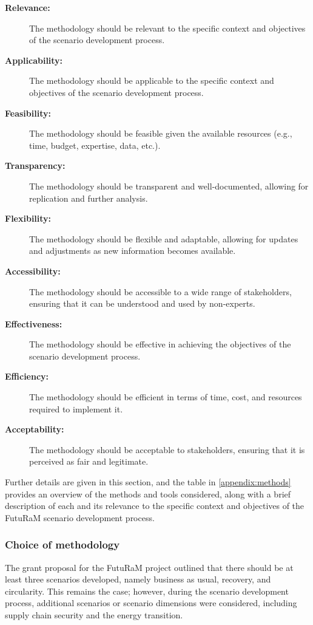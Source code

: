 \begin{description}
  \item[\textbf{Relevance:}]
        The methodology should be relevant to the specific context and objectives of the scenario development process.
  \item[\textbf{Applicability:}]
        The methodology should be applicable to the specific context and objectives of the scenario development process.
  \item[\textbf{Feasibility:}]
        The methodology should be feasible given the available resources (e.g., time, budget, expertise, data, etc.).
  \item[\textbf{Transparency:}]
        The methodology should be transparent and well-documented, allowing for replication and further analysis.
  \item[\textbf{Flexibility:}]
        The methodology should be flexible and adaptable, allowing for updates and adjustments as new information becomes available.
  \item[\textbf{Accessibility:}]
        The methodology should be accessible to a wide range of stakeholders, ensuring that it can be understood and used by non-experts.
  \item[\textbf{Effectiveness:}]
        The methodology should be effective in achieving the objectives of the scenario development process.
  \item[\textbf{Efficiency:}]
        The methodology should be efficient in terms of time, cost, and resources required to implement it.
  \item[\textbf{Acceptability:}]
        The methodology should be acceptable to stakeholders, ensuring that it is perceived as fair and legitimate.
\end{description}


Further details are given in this section, and the table in \autoref{appendix:methods} provides an overview of the methods and tools considered, along with a brief description of each and its relevance to the specific context and objectives of the FutuRaM scenario development process.

\subsubsection{Choice of methodology}
The grant proposal for the FutuRaM project outlined that there should be at least three scenarios developed, namely business as usual, recovery, and circularity. This remains the case; however, during the scenario development process, additional scenarios or scenario dimensions were considered, including supply chain security and the energy transition.


